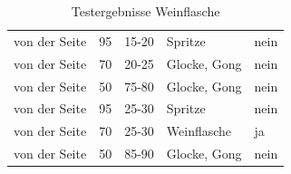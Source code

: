 \begin{table} [H]
\begin{tabular} {l l l l l}
	von der Seite&	95&	15-20&	Spritze\cellcolor{red}&nein\cellcolor{red}\\
	von der Seite&	70&	20-25&	Glocke, Gong\cellcolor{red}&nein\cellcolor{red}\\
	von der Seite&	50&	75-80&	Glocke, Gong\cellcolor{red}&nein\cellcolor{red}\\
	von der Seite&	95&	25-30&	Spritze\cellcolor{red}&nein\cellcolor{red}\\
	von der Seite&	70&	25-30&	Weinflasche\cellcolor{green}&ja\cellcolor{green}\\
	von der Seite&	50&	85-90&	Glocke, Gong\cellcolor{red}&nein\cellcolor{red}\\
	\end{tabular}
	\caption{Testergebnisse Weinflasche}
	\label{Wein}
\end{table}

